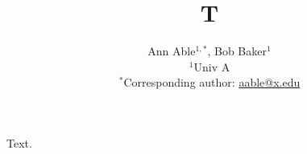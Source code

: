 \documentclass{article}
\title{T}
\author{Ann Able$^{1,*}$, Bob Baker$^1$ \\ $^1$Univ A \\ $^*$Corresponding author: \href{mailto:aable@x.edu}{aable@x.edu}}
\begin{document}
\maketitle
Text.
\end{document}

